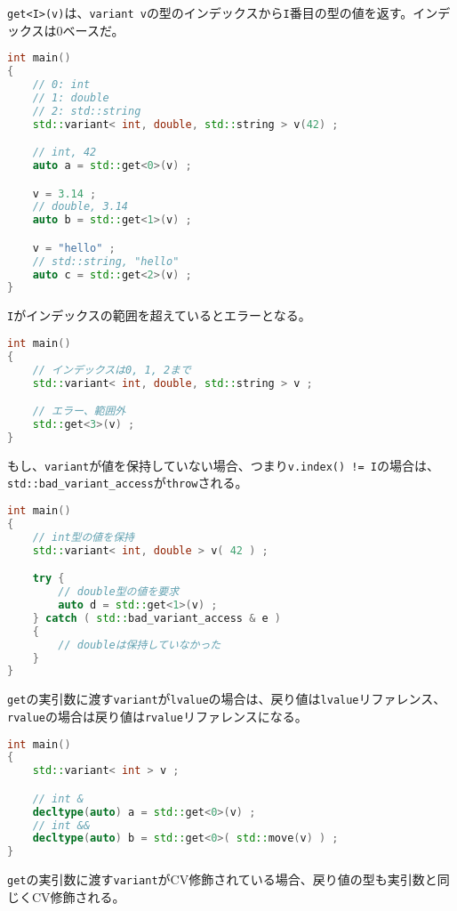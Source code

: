 \lstinline!get<I>(v)!は、\lstinline!variant v!の型のインデックスから\lstinline!I!番目の型の値を返す。インデックスは0ベースだ。

\begin{lstlisting}[language=C++]
int main()
{
    // 0: int
    // 1: double
    // 2: std::string
    std::variant< int, double, std::string > v(42) ;

    // int, 42
    auto a = std::get<0>(v) ;

    v = 3.14 ;
    // double, 3.14
    auto b = std::get<1>(v) ;

    v = "hello" ;
    // std::string, "hello"
    auto c = std::get<2>(v) ;
}
\end{lstlisting}

\lstinline!I!がインデックスの範囲を超えているとエラーとなる。

\begin{lstlisting}[language=C++]
int main()
{
    // インデックスは0, 1, 2まで
    std::variant< int, double, std::string > v ;

    // エラー、範囲外
    std::get<3>(v) ;
}
\end{lstlisting}

もし、\lstinline!variant!が値を保持していない場合、つまり\lstinline"v.index() != I"の場合は、\lstinline!std::bad_variant_access!が\lstinline!throw!される。

\begin{lstlisting}[language=C++]
int main()
{
    // int型の値を保持
    std::variant< int, double > v( 42 ) ;

    try {
        // double型の値を要求
        auto d = std::get<1>(v) ;
    } catch ( std::bad_variant_access & e )
    {
        // doubleは保持していなかった
    }
}
\end{lstlisting}

\lstinline!get!の実引数に渡す\lstinline!variant!が\lstinline!lvalue!の場合は、戻り値は\lstinline!lvalue!リファレンス、\lstinline!rvalue!の場合は戻り値は\lstinline!rvalue!リファレンスになる。

\begin{lstlisting}[language=C++]
int main()
{
    std::variant< int > v ;

    // int &
    decltype(auto) a = std::get<0>(v) ;
    // int &&
    decltype(auto) b = std::get<0>( std::move(v) ) ;
}
\end{lstlisting}

\lstinline!get!の実引数に渡す\lstinline!variant!がCV修飾されている場合、戻り値の型も実引数と同じくCV修飾される。


